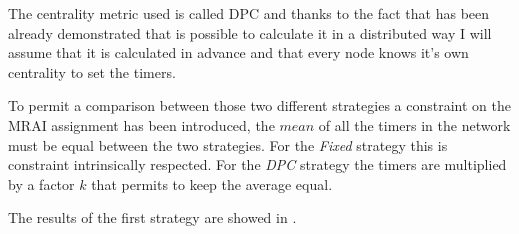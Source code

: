 The centrality metric used is called \ac{DPC} and thanks to the fact that has been
already demonstrated that is possible to calculate it in a distributed way \cite{milani2019BGP} I will
assume that it is calculated in advance and that every node knows it's own centrality to
set the timers.

To permit a comparison between those two different strategies a constraint on the
\ac{MRAI} assignment has been introduced, the $mean$ of all the timers in the network
must be equal between the two strategies.
For the \textit{Fixed} strategy this is constraint intrinsically respected.
For the \textit{DPC} strategy the timers are multiplied by a factor $k$ that
permits to keep the average equal.

The results of the first strategy are showed in .

